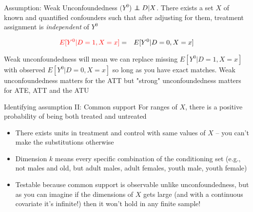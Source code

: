 \documentclass{beamer}
\newcommand\independent{\protect\mathpalette{\protect\independenT}{\perp}}
\def\independenT#1#2{\mathrel{\rlap{$#1#2$}\mkern2mu{#1#2}}}
\begin{document}
\begin{frame}[plain]

	\begin{block}{Assumption: Weak Unconfoundedness}
	$(Y^0$) $\independent{D} | X$. There exists a set $X$ of known and quantified confounders such that after adjusting for them, treatment assignment is \emph{independent} of $Y^0$
	\end{block}
	
	\begin{eqnarray*}
	\textcolor{red}{E[Y^0 | D=1, X=x]} &=& E[Y^0 | D=0, X=x] \\
	\end{eqnarray*}
	
Weak unconfoundedness will mean we can replace missing $E[Y^0|D=1,X=x]$ with observed $E[Y^0|D=0, X=x]$ so long as you have exact matches.  Weak unconfoundedness matters for the ATT but "strong" unconfoundedness matters for ATE, ATT and the ATU
	
	
\end{frame}



\begin{frame}[plain]

	\begin{block}{Identifying assumption II: Common support}
	For ranges of $X$, there is a positive probability of being both treated and untreated
	\end{block}
	
	\begin{itemize}
	\item There exists units in treatment and control with same values of $X$ -- you can't make the substitutions otherwise
	\item Dimension $k$ means every specific combination of the conditioning set (e.g., not males and old, but adult males, adult females, youth male, youth female)
	\item Testable because common support is observable unlike unconfoundedness, but as you can imagine if the dimensions of $X$ gets large (and with a continuous covariate it's infinite!) then it won't hold in any finite sample!
	\end{itemize}
	
	
\end{frame}
\end{document}

